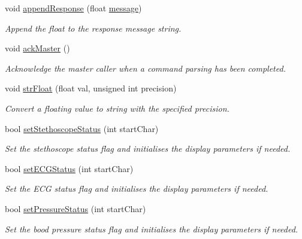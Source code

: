 \begin{DoxyCompactItemize}
void \hyperlink{_meditech___chip_kit_control_panel_8pde_aaf26af1780165c4f85c952760a7b5c3d}{append\-Response} (float \hyperlink{_meditech___chip_kit_control_panel_8pde_ae1956b5b6310b3339e72931911b84e3f}{message})
\begin{DoxyCompactList}\small\item\em Append the float to the response message string. \end{DoxyCompactList}\item 
void \hyperlink{_meditech___chip_kit_control_panel_8pde_a4e435af9ec30d668c4cff6a97baa8e5a}{ack\-Master} ()
\begin{DoxyCompactList}\small\item\em Acknowledge the master caller when a command parsing has been completed. \end{DoxyCompactList}\item 
void \hyperlink{_meditech___chip_kit_control_panel_8pde_a125eb587e203fa47288d5f3493506628}{str\-Float} (float val, unsigned int precision)
\begin{DoxyCompactList}\small\item\em Convert a floating value to string with the specified precision. \end{DoxyCompactList}\item 
bool \hyperlink{_meditech___chip_kit_control_panel_8pde_af1fb1c240965fd8ff8ad7ecf88651a0d}{set\-Stethoscope\-Status} (int start\-Char)
\begin{DoxyCompactList}\small\item\em Set the stethoscope status flag and initialises the display parameters if needed. \end{DoxyCompactList}\item 
bool \hyperlink{_meditech___chip_kit_control_panel_8pde_affc4e4b28b2554dffef9ef55fc1f23a4}{set\-E\-C\-G\-Status} (int start\-Char)
\begin{DoxyCompactList}\small\item\em Set the E\-C\-G status flag and initialises the display parameters if needed. \end{DoxyCompactList}\item 
bool \hyperlink{_meditech___chip_kit_control_panel_8pde_a962bcf9caf0e8d607a561a6e45c1d4cf}{set\-Pressure\-Status} (int start\-Char)
\begin{DoxyCompactList}\small\item\em Set the bood pressure status flag and initialises the display parameters if needed. \end{DoxyCompactList}\item 

\end{DoxyCompactItemize}
